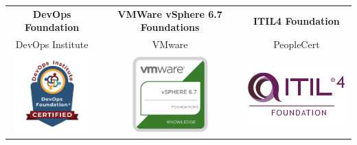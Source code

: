 \documentclass[9pt]{developercv} %
\newif\ifen
\newif\ifes
\newcommand{\en}[1]{\ifen#1\fi}
\newcommand{\es}[1]{\ifes#1\fi}
\begin{document}

\cvsect{
  \es{Certificaciones oficiales}
  \en{Official certifications}
}

\setlength{\tabcolsep}{12pt}
\begin{tabular}{ccc}
  \textbf{DevOps Foundation} & \textbf{VMWare vSphere 6.7 Foundations} & \textbf{ITIL4 Foundation} \\
  DevOps Institute & VMware & PeopleCert \\
  \includegraphics[height=3cm]{img/cert_devops.jpg} &
  \includegraphics[height=3cm]{img/cert_vmware-foundations.png} &
  \includegraphics[height=3cm]{img/cert_itil4-foundation.png}
\end{tabular}\\

\end{document}
